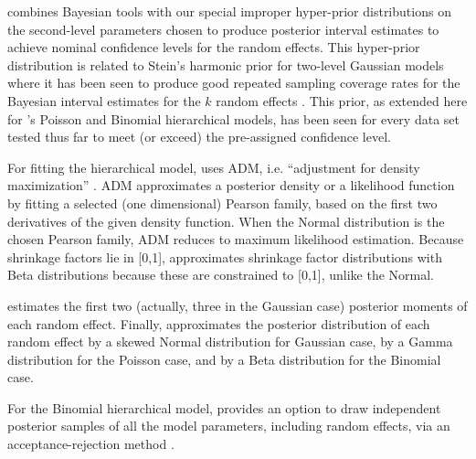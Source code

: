 \documentclass[article]{jss}
\begin{document}
 combines Bayesian tools with our special improper hyper-prior distributions  on the second-level parameters chosen to produce posterior interval   estimates to achieve nominal confidence levels for the random effects. This hyper-prior distribution  is related to Stein's harmonic prior for two-level Gaussian models where it has been seen to produce good repeated sampling coverage rates for the Bayesian interval estimates for the $k$ random effects \citep{tang2011, morris2012, kelly2014advances}.  This prior, as extended here for 's Poisson and Binomial hierarchical models, has been seen for every data set tested thus far to meet (or exceed) the pre-assigned confidence level. 

For fitting the hierarchical model,  uses ADM, i.e. ``adjustment for density maximization'' \citep{carl1988, morris1997, tang2011}.   ADM approximates a posterior density or a likelihood function by fitting a selected (one dimensional) Pearson family, based on the first two derivatives of the given density function.  When the Normal distribution is the chosen Pearson family, ADM reduces to maximum likelihood estimation.   Because shrinkage factors lie in [0,1],  approximates shrinkage factor distributions with Beta distributions because these are constrained to [0,1], unlike the Normal.

 estimates the first two (actually, three in the Gaussian case) posterior moments of each random effect.   Finally,  approximates the posterior distribution of each random effect by a skewed Normal distribution for Gaussian case, by a Gamma distribution for the Poisson case, and by a Beta distribution for the Binomial case.  



For the Binomial  hierarchical model,  provides an option to draw independent posterior samples of all the model parameters, including random effects, via an acceptance-rejection method \citep{robert2013monte}.
\end{document}
